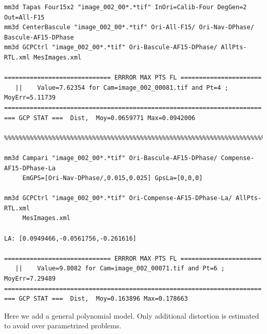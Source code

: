 \begin{verbatim}
mm3d Tapas Four15x2 "image_002_00*.*tif" InOri=Calib-Four DegGen=2 Out=All-F15
mm3d CenterBascule "image_002_00*.*tif" Ori-All-F15/ Ori-Nav-DPhase/ Bascule-AF15-DPhase
mm3d GCPCtrl "image_002_00*.*tif" Ori-Bascule-AF15-DPhase/ AllPts-RTL.xml MesImages.xml

============================= ERRROR MAX PTS FL ======================
   ||    Value=7.62354 for Cam=image_002_00081.tif and Pt=4 ; MoyErr=5.11739
======================================================================
=== GCP STAT ===  Dist,  Moy=0.0659771 Max=0.0942006

%%%%%%%%%%%%%%%%%%%%%%%%%%%%%%%%%%%%%%%%%%%%%%%%%%%%%%%%%%%%%%%%%%%%%%%%%%%%%%%%%%%%%%%%%

mm3d Campari "image_002_00*.*tif" Ori-Bascule-AF15-DPhase/ Compense-AF15-DPhase-La 
     EmGPS=[Ori-Nav-DPhase/,0.015,0.025] GpsLa=[0,0,0]
     
mm3d GCPCtrl "image_002_00*.*tif" Ori-Compense-AF15-DPhase-La/ AllPts-RTL.xml 
     MesImages.xml

LA: [0.0949466,-0.0561756,-0.261616]

============================= ERRROR MAX PTS FL ======================
   ||    Value=9.8082 for Cam=image_002_00071.tif and Pt=6 ; MoyErr=7.29489
======================================================================
=== GCP STAT ===  Dist,  Moy=0.163896 Max=0.178663
\end{verbatim}


Here we add a general polynomial model. Only additional distortion is estimated to avoid over parametrized problems.

